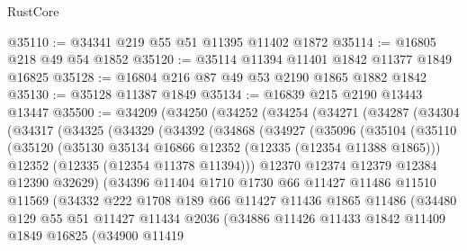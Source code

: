 \begin{lexlean}{RustCore}
\begin{coremodule}
@35110 := @34341 @219 @55 @51 @11395 @11402 @1872
@35114 := @16805 @218 @49 @54 @1852
@35120 := @35114 @11394 @11401 @1842 @11377 @1849 @16825
@35128 := @16804 @216 @87 @49 @53 @2190 @1865 @1882 @1842
@35130 := @35128 @11387 @1849
@35134 := @16839 @215 @2190 @13443 @13447
@35500 := @34209
    (@34250
      (@34252
        (@34254
          (@34271
            (@34287
              (@34304
                (@34317
                  (@34325
                    (@34329
                      (@34392
                        (@34868
                          (@34927
                            (@35096
                              (@35104
                                (@35110
                                  (@35120
                                    (@35130 @35134 @16866 @12352 (@12335 (@12354 @11388 @1865)))
                                    @12352
                                    (@12335 (@12354 @11378 @11394)))
                                  @12370
                                  @12374
                                  @12379
                                  @12384
                                  @12390
                                  @32629)
                                (@34396
                                  @11404
                                  @1710
                                  @1730
                                  @66
                                  @11427
                                  @11486
                                  @11510
                                  @11569
                                  (@34332
                                    @222
                                    @1708
                                    @189
                                    @66
                                    @11427
                                    @11436
                                    @1865
                                    @11486
                                    (@34480
                                      @129
                                      @55
                                      @51
                                      @11427
                                      @11434
                                      @2036
                                      (@34886
                                        @11426
                                        @11433
                                        @1842
                                        @11409
                                        @1849
                                        @16825
                                        (@34900
                                          @11419

\end{coremodule}
\end{lexlean}
